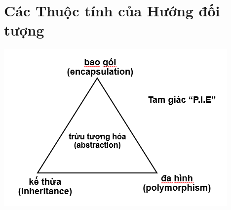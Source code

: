 \documentclass{article}
\begin{document}
\section{Các Thuộc tính của Hướng đối tượng}
\includegraphics{PIE}
\end{document}

